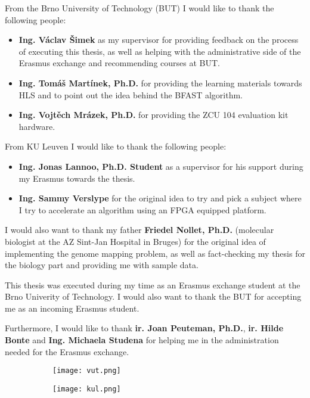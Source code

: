 From the Brno University of Technology (BUT) I would like to thank the following people:
\begin{itemize}
	\item \textbf{Ing. V\'aclav \v Simek} as my supervisor for providing feedback on the process of executing this thesis, as well as helping with the administrative side of the Erasmus exchange and recommending courses at BUT.
	\item \textbf{Ing. Tom\'a\v s Mart\'inek, Ph.D.} for providing the learning materials towards HLS and to point out the idea behind the BFAST algorithm.
	\item \textbf{Ing. Vojt\v ech Mr\'azek, Ph.D.} for providing the ZCU 104 evaluation kit hardware.
\end{itemize}

From KU Leuven I would like to thank the following people:
\begin{itemize}
	\item \textbf{Ing. Jonas Lannoo,
		Ph.D. Student} as a supervisor for his support during my Erasmus towards the thesis.
	\item \textbf{Ing. Sammy Verslype} for the original idea to try and pick a subject where I try to accelerate an algorithm using an FPGA equipped platform.
\end{itemize} 

I would also want to thank my father \textbf{Friedel Nollet, Ph.D.} (molecular biologist at the AZ Sint-Jan Hospital in Bruges) for the original idea of implementing the genome mapping problem, as well as fact-checking my thesis for the biology part and providing me with sample data.

This thesis was executed during my time as an Erasmus exchange student at the Brno Univerity of Technology. I would also want to thank the BUT for accepting me as an incoming Erasmus student.

Furthermore, I would like to thank \textbf{ir. Joan Peuteman, Ph.D.}, \textbf{ir. Hilde Bonte} and \textbf{Ing. Michaela Studena} for helping me in the administration needed for the Erasmus exchange.

\begin{figure}[H]
	\centering
	\begin{subfigure}[H]{0.3\textwidth}
		\texttt{[image: vut.png]}
	\end{subfigure}
\qquad
	\begin{subfigure}[H]{0.3\textwidth}
		\texttt{[image: kul.png]}
	\end{subfigure}
\end{figure}